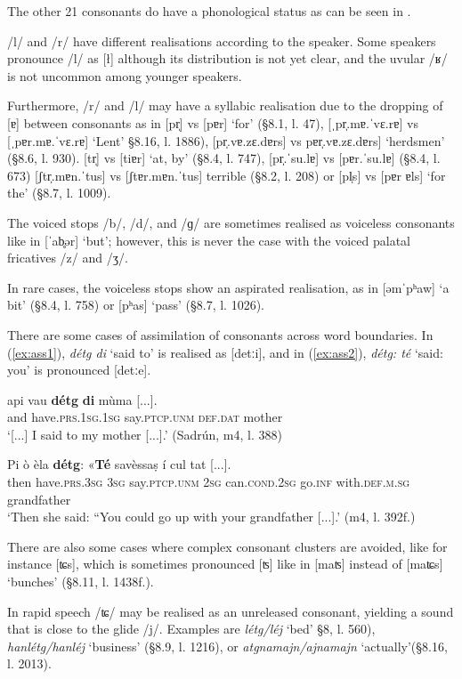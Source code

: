 The other 21 consonants do have a phonological status as can be seen in .

/l/ and /r/ have different realisations according to the speaker. Some speakers pronounce /l/ as [ł] although its distribution is not yet clear, and the uvular /ʁ/ is not uncommon among younger speakers.

Furthermore, /r/ and /l/ may have a syllabic realisation due to the dropping of [ɐ] between consonants as in [pr̩] vs [pɐr] `for' (§8.1, l. 47),  [ˌpr̩.mɐ.ˈvɛ.rɐ] vs [ˌpɐr.mɐ.ˈvɛ.rɐ] `Lent' §8.16, l.  1886), [pr̩.vɐ.zɛ.dɐrs] vs  pɐr̩.vɐ.zɛ.dɐrs] `herdsmen' (§8.6, l. 930). [tr̩] vs [tiɐr] `at, by' (§8.4, l. 747), [pr̩.ˈsu.lɐ] vs [pɐr.ˈsu.lɐ] (§8.4, l. 673) [ʃtr̩.mɐn.ˈtus] vs [ʃtɐr.mɐn.ˈtus] terrible (§8.2, l. 208) or [pl̩s] vs [pɐr ɐls] `for the' (§8.7, l. 1009).

The voiced stops /b/, /d/, and /ɡ/ are sometimes realised as voiceless consonants like in [ˈab̥ər] `but'; however, this is never the case with the voiced palatal fricatives /z/ and /ʒ/.

In rare cases, the voiceless stops show an aspirated realisation, as in [əmˈpʰaw] `a bit' (§8.4, l. 758) or [pʰas] `pass' (§8.7, l. 1026).

There are some cases of assimilation of consonants across word boundaries. In (\ref{ex:ass1}), \textit{détg di} `said to' is realised as [detːi], and in (\ref{ex:ass2}), \textit{détg: té} `said: you' is pronounced [detːe].


\ea\label{ex:ass1}
\gll [...] api vau \textbf{détg} \textbf{di} mùma [...].\\
{} and have.\textsc{prs.1sg.1sg} say.\textsc{ptcp.unm} \textsc{def.dat} mother\\
\glt `[...] I said to my mother [...].' (Sadrún, m4, l. 388)
\z

\ea\label{ex:ass2}
\gll Pi ò èla \textbf{détg}: «\textbf{Té} savèssaṣ í cul tat [...].\\
then have.\textsc{prs.3sg} \textsc{3sg} say.\textsc{ptcp.unm} \textsc{2sg} can.\textsc{cond.2sg} go.\textsc{inf}  with.\textsc{def.m.sg} grandfather\\
\glt `Then she said: “You could go up with your grandfather [...].' (m4, l. 392f.)
\z

There are also some cases where complex consonant clusters are avoided, like for instance [ʨs], which is sometimes pronounced [ʦ] like in [maʦ] instead of [maʨs] `bunches' (§8.11, l. 1438f.).

In rapid speech /ʨ/ may be realised as an unreleased consonant, yielding a sound that is close to the glide /j/. Examples are \textit{létg/léj} `bed'  §8, l. 560), \textit{hanlétg/hanléj} `business' (§8.9, l. 1216), or \textit{atgnamajn/ajnamajn} `actually'(§8.16, l. 2013).

